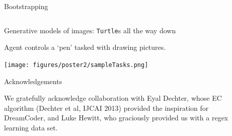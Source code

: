 \documentclass[final]{beamer}
\newlength{\onecolwid}
\newlength{\threecolwid}
\newcommand{\code}[1]{{\texttt{#1}}}
\newcommand{\pop}[1]{\textcolor{pop1}{#1}}
\newcommand{\popp}[1]{\textcolor{pop2}{#1}}
\begin{document}
\begin{frame}[t]
\begin{columns}[t]
\begin{column}{\threecolwid}
\begin{columns}[t,totalwidth=\threecolwid]
\begin{column}{\threecolwid}
\begin{columns}[t,totalwidth=\threecolwid]
\begin{column}{\onecolwid}
\begin{block}{Bootstrapping}
  
\end{block}

\end{column}
\end{columns}

\begin{block}{Generative models of images: \texttt{Turtle}s all the way down}

Agent controls a `pen' tasked with drawing pictures.
  
  \texttt{[image: figures/poster2/sampleTasks.png]}

\end{block}


\begin{block}{Acknowledgements}

  We gratefully acknowledge collaboration with Eyal Dechter, whose EC algorithm (Dechter et al, IJCAI 2013) provided the inspiration for DreamCoder, and Luke Hewitt, who graciously provided us with
  a regex learning data set.

\end{block}





\end{column} %



\begin{column}{\onecolwid} %

\newcommand{\greenCode}[1]{{\footnotesize\popp{\code{#1}}}}
\newcommand{\blueCode}[1]{{\footnotesize\pop{\code{#1}}}}














\end{column}
\end{columns}
\end{column}
\end{columns}
\end{frame}
\end{document}
